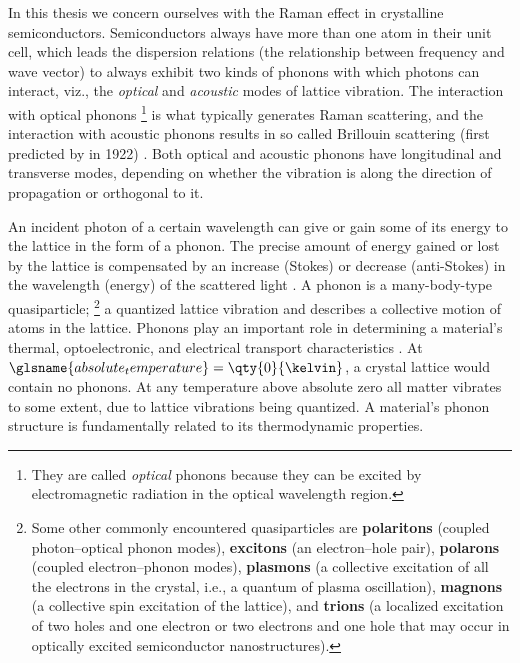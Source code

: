 \documentclass[draft,webedition,openright,titles,swedish,english]{LuaUUThesis}\usepackage[]{graphicx}\usepackage[]{xcolor}
\newcommand{\ie}{i.e.}
\newcommand{\viz}{viz.}
\newcommand{\namely}{\viz}
\begin{document}
In this thesis we concern ourselves with the Raman effect in crystalline semiconductors.
Semiconductors always have more than one atom in their unit cell, which leads
the dispersion relations (the relationship between frequency and wave vector) to
always exhibit two kinds of phonons with which photons can interact, \namely,
the \emph{optical} and \emph{acoustic} modes of lattice vibration.
The interaction with optical phonons%
\footnote{
   They are called \emph{optical} phonons because they can be
   excited by electromagnetic radiation in the optical wavelength region.
}
is what typically generates Raman scattering, and
the interaction with acoustic phonons results in so called Brillouin scattering
(first predicted by \textcite{Brillouin1922} in 1922) \cite{Pankove1975}.
Both optical and acoustic phonons have longitudinal and transverse modes,
depending on whether the vibration is along the direction of propagation
or orthogonal to it.

An incident photon of a certain wavelength can give or gain some of its energy
to the lattice in the form of a phonon.
The precise amount of energy gained or lost by the lattice is compensated by
an increase (Stokes) or decrease (anti-Stokes) in the wavelength (energy) of
the scattered light \cite{Loudon1964,Pankove1975}.
A phonon is a many-body-type quasiparticle;%
\footnote{%
   Some other commonly encountered quasiparticles are
   \textbf{polaritons} (coupled photon--optical phonon modes),
   \textbf{excitons} (an electron--hole pair),
   \textbf{polarons} (coupled electron--phonon modes),
   \textbf{plasmons} (a collective excitation of all the electrons in the crystal, \ie, a quantum of plasma oscillation),
   \textbf{magnons} (a collective spin excitation of the lattice),
   and
   \textbf{trions} (a localized excitation of two holes and one electron or two electrons
   and one hole that may occur in optically excited semiconductor nanostructures).}
a quantized lattice vibration and describes a collective motion of atoms in the lattice.
Phonons play an important role in determining a material's thermal, optoelectronic,
and electrical transport characteristics \cite{Senga2019}.
At $\glsname{absolute_temperature}=\qty{0}{\kelvin}$, a crystal lattice would contain no phonons.
At any temperature above absolute zero all matter vibrates to some extent,
due to lattice vibrations being quantized.
A material's phonon structure is fundamentally related to its thermodynamic
properties.

%
\end{document}
